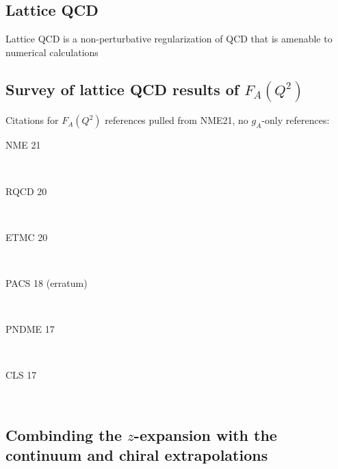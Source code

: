 \subsection{Lattice QCD\label{sec:lqcd_intro}}
Lattice QCD is a non-perturbative regularization of QCD that is amenable to numerical calculations



\subsection{Survey of lattice QCD results of $F_A(Q^2)$\label{sec:lqcd_results}}

Citations for $F_A(Q^2)$ references pulled from NME21, no $g_A$-only references:
\begin{description}
\item[NME 21]~\cite{Park:2021ypf}
\item[RQCD 20]~\cite{Bali:2018qus,RQCD:2019jai} %
\item[ETMC 20]~\cite{Alexandrou:2018sjm,Alexandrou:2019brg,Alexandrou:2020okk} %
\item[PACS 18 (erratum)]~\cite{Ishikawa:2018rew,Shintani:2018ozy} %
\item[PNDME 17]~\cite{Gupta:2017dwj,Gupta:2018qil,Jang:2019vkm,Jang:2019jkn} %
\item[CLS 17]~\cite{Hasan:2017wwt,Hasan:2019noy} %
\end{description}


\subsection{Combinding the $z$-expansion with the continuum and chiral extrapolations\label{sec:z_continuum}}
